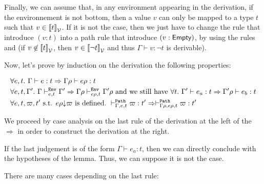 \documentclass[a4paper]{article}
\theoremstyle{definition}
\begin{document}
        Finally, we can assume that, in any environment appearing in the derivation, if the environnement is not bottom,
        then a value $v$ can only be mapped to a type $t$ such that $v\in{\llbracket t \rrbracket}_{\mathcal{V}}$. If it is not the case, then we just have to change the
         rule that introduce $(v:t)$ into a path rule that introduce $(v:\textsf{Empty})$,
        by using the rules  and  (if $v\not\in{\llbracket t \rrbracket}_{\mathcal{V}}$, then $v\in{\llbracket \neg t \rrbracket}_{\mathcal{V}}$
        and thus $\Gamma \vdash v:\neg t$ is derivable).

        Now, let's prove by induction on the derivation the following properties:

        \begin{align*}
          &\forall e,t.\ \Gamma \vdash e:t \Rightarrow \Gamma\rho \vdash e\rho:t\\
          &\forall e,t,\Gamma'.\ \Gamma \vdash^{\texttt{Env}}_{e,t} \Gamma' \Rightarrow \Gamma\rho \vdash^{\texttt{Env}}_{e\rho,t} {\Gamma'}\rho
          \text{ and we still have } \forall t.\ \Gamma' \vdash e_a : t \Rightarrow \Gamma'\rho \vdash e_b:t\\
          &\forall e,t,\varpi,t' \text{ s.t. $e\rho{\downarrow}\varpi$ is defined}.\ \vdash^{\texttt{Path}}_{\Gamma,e,t} \varpi:t' \Rightarrow \vdash^{\texttt{Path}}_{\Gamma\rho,e\rho,t} \varpi:t'
        \end{align*}

        We proceed by case analysis on the last rule of the derivation at the left of the $\Rightarrow$ in order to construct the derivation at the right.
        
        If the last judgement is of the form $\Gamma \vdash e_a: t$, then we can directly conclude with the hypotheses of the lemma.
        Thus, we can suppose it is not the case.

        There are many cases depending on the last rule:
\end{document}
